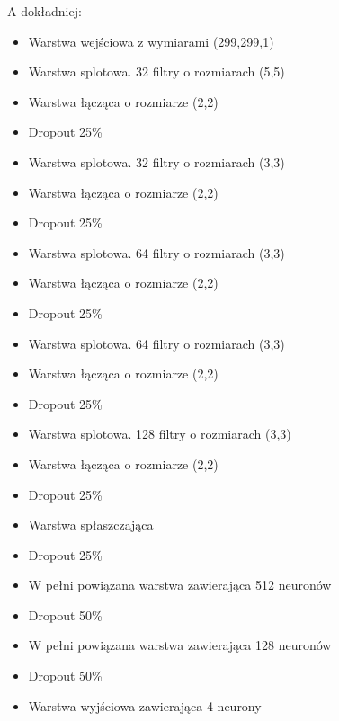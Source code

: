 \documentclass{article}
\begin{document}
A dokładniej:
\begin{itemize}
	\item Warstwa wejściowa z wymiarami (299,299,1)
	
	\item Warstwa splotowa. 32 filtry o rozmiarach (5,5)
	\item Warstwa łącząca o rozmiarze (2,2)
	\item Dropout 25\%
	
	\item Warstwa splotowa. 32 filtry o rozmiarach (3,3)
	\item Warstwa łącząca o rozmiarze (2,2)
	\item Dropout 25\%
	
	\item Warstwa splotowa. 64 filtry o rozmiarach (3,3)
	\item Warstwa łącząca o rozmiarze (2,2)
	\item Dropout 25\%
	
	\item Warstwa splotowa. 64 filtry o rozmiarach (3,3)
	\item Warstwa łącząca o rozmiarze (2,2)
	\item Dropout 25\%
	
	\item Warstwa splotowa. 128 filtry o rozmiarach (3,3)
	\item Warstwa łącząca o rozmiarze (2,2)
	\item Dropout 25\%
	
	\item Warstwa spłaszczająca
	\item Dropout 25\%
	
	\item W pełni powiązana warstwa zawierająca 512 neuronów
	\item Dropout 50\%
	
	\item W pełni powiązana warstwa zawierająca 128 neuronów
	\item Dropout 50\%
	
	\item Warstwa wyjściowa zawierająca 4 neurony
\end{itemize}


\end{document}
